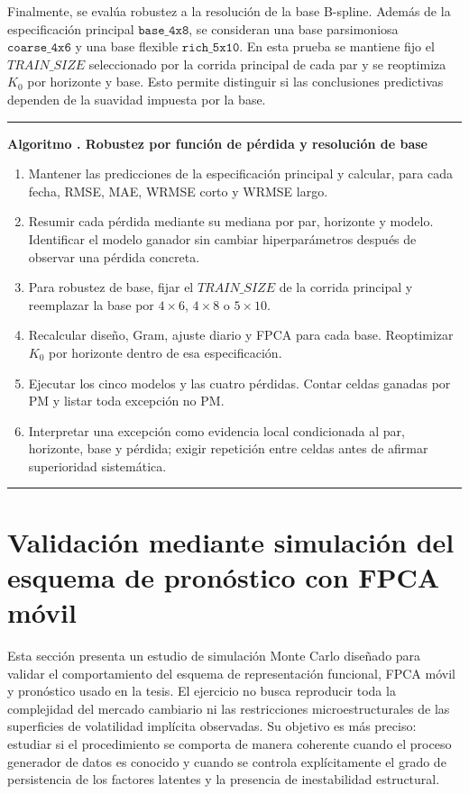 \documentclass[a4paper,11pt]{article}
\newcommand{\SVIs}{superficies de volatilidad implícita}
\newcounter{algoritmotesis}
\newenvironment{algoritmotesis}[1]{%
  \refstepcounter{algoritmotesis}%
  \par\medskip
  \noindent\begin{minipage}{\linewidth}
  \hrule\vspace{0.6em}
  \textbf{Algoritmo \thealgoritmotesis. #1}
  \begin{enumerate}
}{%
  \end{enumerate}
  \vspace{0.2em}\hrule
  \end{minipage}
  \par\medskip
}
\begin{document}
Finalmente, se evalúa robustez a la resolución de la base B-spline. Además de la especificación principal \(\texttt{base\_4x8}\), se consideran una base parsimoniosa \(\texttt{coarse\_4x6}\) y una base flexible \(\texttt{rich\_5x10}\). En esta prueba se mantiene fijo el \(TRAIN\_SIZE\) seleccionado por la corrida principal de cada par y se reoptimiza \(K_0\) por horizonte y base. Esto permite distinguir si las conclusiones predictivas dependen de la suavidad impuesta por la base.

\begin{algoritmotesis}{Robustez por función de pérdida y resolución de base}
  \item Mantener las predicciones de la especificación principal y calcular, para cada fecha, RMSE, MAE, WRMSE corto y WRMSE largo.
  \item Resumir cada pérdida mediante su mediana por par, horizonte y modelo. Identificar el modelo ganador sin cambiar hiperparámetros después de observar una pérdida concreta.
  \item Para robustez de base, fijar el \(TRAIN\_SIZE\) de la corrida principal y reemplazar la base por \(4\times6\), \(4\times8\) o \(5\times10\).
  \item Recalcular diseño, Gram, ajuste diario y FPCA para cada base. Reoptimizar \(K_0\) por horizonte dentro de esa especificación.
  \item Ejecutar los cinco modelos y las cuatro pérdidas. Contar celdas ganadas por PM y listar toda excepción no PM.
  \item Interpretar una excepción como evidencia local condicionada al par, horizonte, base y pérdida; exigir repetición entre celdas antes de afirmar superioridad sistemática.
\end{algoritmotesis}

\section{Validación mediante simulación del esquema de pronóstico con FPCA móvil}
\label{sec:simulacion}

Esta sección presenta un estudio de simulación Monte Carlo diseñado para validar el comportamiento del esquema de representación funcional, FPCA móvil y pronóstico usado en la tesis. El ejercicio no busca reproducir toda la complejidad del mercado cambiario ni las restricciones microestructurales de las \SVIs{} observadas. Su objetivo es más preciso: estudiar si el procedimiento se comporta de manera coherente cuando el proceso generador de datos es conocido y cuando se controla explícitamente el grado de persistencia de los factores latentes y la presencia de inestabilidad estructural.
\end{document}
